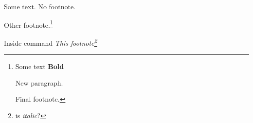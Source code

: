 \documentclass{article}
\begin{document}
Some text.
No footnote.

Other footnote.\footnote{Some text
\textbf{Bold}

New paragraph.

Final footnote.
}

Inside command
\emph{This footnote\footnote{
is \emph{italic}?}
}
\end{document}
